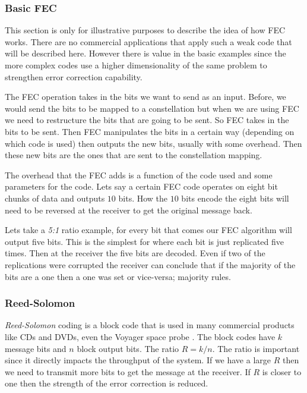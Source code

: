 	
\subsubsection{Basic FEC}

This section is only for illustrative purposes to describe the idea of how \ac{FEC} works. There are no commercial applications that apply such a weak code that will be described here. However there is value in the basic examples since the more complex codes use a higher dimensionality of the same problem to strengthen error correction capability.

The \ac{FEC} operation takes in the bits we want to send as an input. Before, we would send the bits to be mapped to a constellation but when we are using \ac{FEC} we need to restructure the bits that are going to be sent. So \ac{FEC} takes in the bits to be sent. Then \ac{FEC} manipulates the bits in a certain way (depending on which code is used) then outputs the new bits, usually with some overhead. Then these new bits are the ones that are sent to the constellation mapping.

The overhead that the \ac{FEC} adds is a function of the code used and some parameters for the code. Lets say a certain \ac{FEC} code operates on eight bit chunks of data and outputs $10$ bits. How the $10$ bits encode the eight bits will need to be reversed at the receiver to get the original message back.  

Lets take a \emph{5:1} ratio example, for every bit that comes our \ac{FEC} algorithm will output five bits. This is the simplest for where each bit is just replicated five times. Then at the receiver the five bits are decoded. Even if two of the replications were corrupted the receiver can conclude that if the majority of the bits are a one then a one was set or vice-versa; majority rules.
	
\subsubsection{Reed-Solomon}

\emph{Reed-Solomon} coding is a block code that is used in many commercial products like \ac{CD}s and \ac{DVD}s, even the Voyager space probe \cite{wicker1999reed}. The block codes have $k$ message bits and $n$ block output bits. The ratio $R=k/n$. The ratio is important since it directly impacts the throughput of the system. If we have a large $R$ then we need to transmit more bits to get the message at the receiver. If $R$ is closer to one then the strength of the error correction is reduced.

